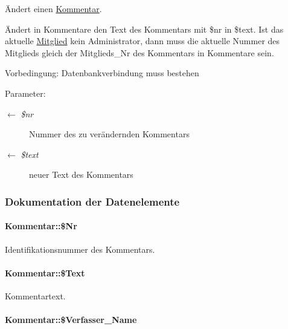 Ändert einen \hyperlink{classKommentar}{Kommentar}. 

Ändert in Kommentare den Text des Kommentars mit \$nr in \$text. Ist das aktuelle \hyperlink{classMitglied}{Mitglied} kein Administrator, dann muss die aktuelle Nummer des Mitglieds gleich der Mitglieds\_\-Nr des Kommentars in Kommentare sein. \begin{Desc}
\item[Vorbedingung:]Datenbankverbindung muss bestehen \end{Desc}
\begin{Desc}
\item[Parameter:]
\begin{description}
\item[\mbox{$\leftarrow$} {\em \$nr}]Nummer des zu verändernden Kommentars \item[\mbox{$\leftarrow$} {\em \$text}]neuer Text des Kommentars \end{description}
\end{Desc}


\subsubsection{Dokumentation der Datenelemente}
\hypertarget{classKommentar_1b0a3cfcb9fc7075f985cc8067ab1982}{
\paragraph[\$Nr]{\setlength{\rightskip}{0pt plus 5cm}Kommentar::\$Nr}\hfill}
\label{classKommentar_1b0a3cfcb9fc7075f985cc8067ab1982}


Identifikationsnummer des Kommentars. 

\hypertarget{classKommentar_c9a481413d6ba0c000719ad514bad4b5}{
\paragraph[\$Text]{\setlength{\rightskip}{0pt plus 5cm}Kommentar::\$Text}\hfill}
\label{classKommentar_c9a481413d6ba0c000719ad514bad4b5}


Kommentartext. 

\hypertarget{classKommentar_84f0fc10295968adde28169f8df018d9}{
\paragraph[\$Verfasser\_\-Name]{\setlength{\rightskip}{0pt plus 5cm}Kommentar::\$Verfasser\_\-Name}\hfill}
\label{classKommentar_84f0fc10295968adde28169f8df018d9}


